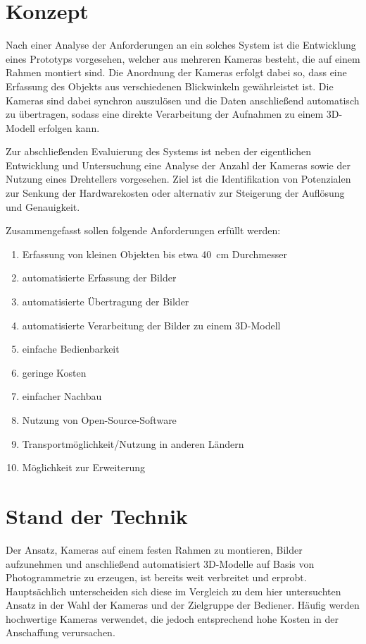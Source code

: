 \documentclass[./00PhotoBox]{subfiles}
\begin{document}
\section{Konzept}
Nach einer Analyse der Anforderungen an ein solches System ist die Entwicklung eines Prototyps vorgesehen, welcher aus mehreren Kameras besteht, die auf einem Rahmen montiert sind. Die Anordnung der Kameras erfolgt dabei so, dass eine Erfassung des Objekts aus verschiedenen Blickwinkeln gewährleistet ist. Die Kameras sind dabei synchron auszulösen und die Daten anschließend automatisch zu übertragen, sodass eine direkte Verarbeitung der Aufnahmen zu einem 3D-Modell erfolgen kann.

Zur abschließenden Evaluierung des Systems ist neben der eigentlichen Entwicklung und Untersuchung eine Analyse der Anzahl der Kameras sowie der Nutzung eines Drehtellers vorgesehen. Ziel ist die Identifikation von Potenzialen zur Senkung der Hardwarekosten oder alternativ zur Steigerung der Auflösung und Genauigkeit.

Zusammengefasst sollen folgende Anforderungen erfüllt werden:

\begin{enumerate}
    \item Erfassung von kleinen Objekten bis etwa \SI{40}{\centi\metre} Durchmesser
    \item automatisierte Erfassung der Bilder
    \item automatisierte Übertragung der Bilder
    \item automatisierte Verarbeitung der Bilder zu einem 3D-Modell
    \item einfache Bedienbarkeit
    \item geringe Kosten
    \item einfacher Nachbau
    \item Nutzung von Open-Source-Software
    \item Transportmöglichkeit/Nutzung in anderen Ländern
    \item Möglichkeit zur Erweiterung
\end{enumerate}

\section{Stand der Technik}
Der Ansatz, Kameras auf einem festen Rahmen zu montieren, Bilder aufzunehmen und anschließend automatisiert 3D-Modelle auf Basis von Photogrammetrie zu erzeugen, ist bereits weit verbreitet und erprobt. Hauptsächlich unterscheiden sich diese im Vergleich zu dem hier untersuchten Ansatz in der Wahl der Kameras und der Zielgruppe der Bediener. Häufig werden hochwertige Kameras verwendet, die jedoch entsprechend hohe Kosten in der Anschaffung verursachen.
\end{document}
